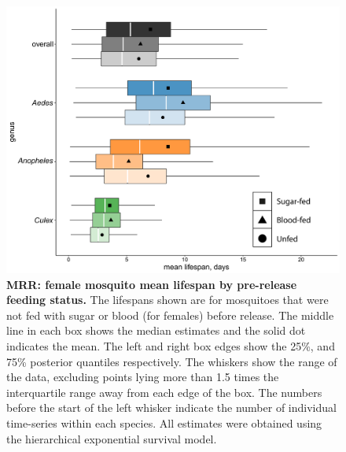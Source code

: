 \documentclass[12pt]{article}
\begin{document}
\begin{figure}[h]
	\centerline{\includegraphics[width=1\textwidth]{./Figure_files/mrr_female_blood_sugar.pdf}}
	\caption{\textbf{MRR: female mosquito mean lifespan by pre-release feeding status.} The lifespans shown are for mosquitoes that were not fed with sugar or blood (for females) before release. The middle line in each box shows the median estimates and the solid dot indicates the mean. The left and right box edges show the 25\%, and 75\% posterior quantiles respectively. The whiskers show the range of the data, excluding points lying more than 1.5 times the interquartile range away from each edge of the box. The numbers before the start of the left whisker indicate the number of individual time-series within each species. All estimates were obtained using the hierarchical exponential survival model.}
	\label{fig:mrr_female_blood_sugar}
\end{figure}
\end{document}
